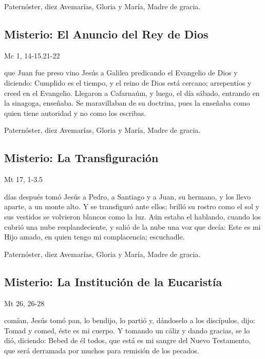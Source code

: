 \documentclass[10pt,a4paper,oneside]{book}
\newcounter{lux-counter}
\begin{document}
\begin{center}
      Paternóster, diez Avemarías, Gloria y María, Madre de gracia.
\end{center}

\subsection*{ Misterio: El Anuncio del Rey de Dios}
\begin{flushright}
      {\color{red}Mc 1, 14-15.21-22}
\end{flushright}
 que Juan fue preso vino Jesús a Galilea predicando el Evangelio de Dios y diciendo: Cumplido es el tiempo, y el reino de Dios está cercano; 
arrepentíos y creed en el Evangelio. Llegaron a Cafarnaúm, y luego, el día sábado, entrando en la sinagoga, enseñaba. Se maravillaban de su doctrina, 
pues la enseñaba como quien tiene autoridad y no como los escribas.

\begin{center}
      Paternóster, diez Avemarías, Gloria y María, Madre de gracia.
\end{center}

\subsection*{ Misterio: La Transfiguración}
\begin{flushright}
      {\color{red}Mt 17, 1-3.5}
\end{flushright}
 días después tomó Jesús a Pedro, a Santiago y a Juan, su hermano, y los llevo aparte, a un monte alto. Y se transfiguró ante ellos; 
brilló su rostro como el sol y sus vestidos se volvieron blancos como la luz. Aún estaba el hablando, cuando los cubrió una nube resplandeciente, 
y salió de la nube una voz que decía: Este es mi Hijo amado, en quien tengo mi complacencia; escuchadle.

\begin{center}
      Paternóster, diez Avemarías, Gloria y María, Madre de gracia.
\end{center}

\subsection*{ Misterio: La Institución de la Eucaristía}
\begin{flushright}
      {\color{red}Mt 26, 26-28}
\end{flushright}
 comían, Jesús tomó pan, lo bendijo, lo partió y, dándoselo a los discípulos, dijo: Tomad y comed, éste es mi cuerpo. Y tomando un cáliz y dando gracias, 
se lo dió, diciendo: Bebed de él todos, que está es mi sangre del Nuevo Testamento, que será derramada por muchos para remisión de los pecados.
\end{document}
